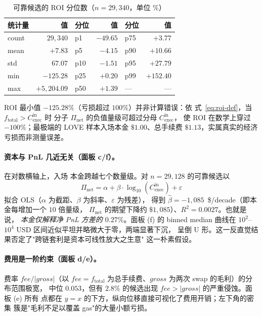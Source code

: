 \documentclass[sigconf,nonacm,10pt]{acmart}
\newcommand{\Cexec}{C_{\text{exec}}}
\newcommand{\Pnet}{\Pi_{\text{net}}}
\begin{document}
\begin{table}[h]
  \centering
  \small
  \caption{可靠候选的 ROI 分位数（$n=29{,}340$，单位 \%）}
  \label{tab:roi-quantiles}
  \begin{tabular}{lr|lr|lr}
    \toprule
    \textbf{统计量} & \textbf{值} & \textbf{分位} & \textbf{值} & \textbf{分位} & \textbf{值} \\
    \midrule
    count & $29{,}340$ & p1   & $-49.65$ & p75 & $+3.77$ \\
    mean  & $+7.83$    & p5   & $-4.15$  & p90 & $+10.66$ \\
    std   & $67.07$    & p10  & $-1.51$  & p95 & $+27.79$ \\
    min   & $-125.28$  & p25  & $+0.20$  & p99 & $+152.40$ \\
    max   & $+5{,}204.09$ & p50 & $+1.39$ & --- & --- \\
    \bottomrule
  \end{tabular}
\end{table}

ROI 最小值 $-125.28\%$（亏损超过 $100\%$）并非计算错误：依
式~\eqref{eq:roi-def}，当 $f_{\text{total}}>\Cexec^{\text{in}}$ 时
分子 $\Pnet$ 的负值量级可超过分母 $\Cexec^{\text{in}}$，
使 ROI 在数学上穿过 $-100\%$；最极端的 LOVE 样本入场本金
$\$1.00$、总手续费 $\$1.13$，实属真实的经济亏损而非测量误差。

\paragraph{资本与 PnL 几近无关（面板 c/f）。} 在对数横轴上，入场
本金跨越七个数量级。对 $n=29{,}128$ 的可靠候选以
\begin{equation}
  \Pnet = \alpha + \beta\cdot\log_{10}(\Cexec^{\text{in}}) + \varepsilon
  \label{eq:ols}
\end{equation}
拟合 OLS（$\alpha$ 为截距、$\beta$ 为斜率、$\varepsilon$ 为残差），
得到 $\hat\beta=-1{,}085$~\$/decade（即本金每增加一个 $10$ 倍量级，
$\Pnet$ 的期望下降约 $\$1{,}085$）、$R^2=0.0027$。也就是说，
\emph{本金仅解释净 PnL 方差的 $0.27\%$}。面板 (f) 的 binned median
曲线在 $10^2$--$10^4$ USD 区间近似平坦并略微大于零，两端显著下沉，
呈倒 U 形。这一反直觉结果否定了"跨链套利是资本可线性放大之生意"
这一朴素假设。

\paragraph{费用是一阶约束（面板 d/e）。} 费率
$\mathit{fee}/|\mathit{gross}|$（以 $\mathit{fee}=f_{\text{total}}$
为总手续费、$\mathit{gross}$ 为两次 swap 的毛利）的分布范围极宽，
中位 $0.053$，但有 $2.8\%$ 的候选出现 $\mathit{fee}>|\mathit{gross}|$
的严重侵蚀。面板 (e) 所有
点都在 $y=x$ 的下方，纵向位移直接可视化了费用开销；左下角的密集
簇是"毛利不足以覆盖 gas"的大量小额亏损。
\end{document}
